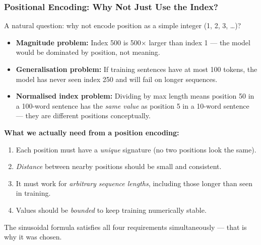 \begin{frame}[fragile]\frametitle{Positional Encoding: Why Not Just Use the Index?}

A natural question: why not encode position as a simple integer (1, 2, 3, \ldots)?

\begin{itemize}
\item \textbf{Magnitude problem:} Index 500 is 500$\times$ larger than index 1 --- the model would be dominated by position, not meaning.
\item \textbf{Generalisation problem:} If training sentences have at most 100 tokens, the model has never seen index 250 and will fail on longer sequences.
\item \textbf{Normalised index problem:} Dividing by max length means position 50 in a 100-word sentence has the \emph{same value} as position 5 in a 10-word sentence --- they are different positions conceptually.
\end{itemize}

\textbf{What we actually need from a position encoding:}
\begin{enumerate}
\item Each position must have a \emph{unique} signature (no two positions look the same).
\item \emph{Distance} between nearby positions should be small and consistent.
\item It must work for \emph{arbitrary sequence lengths}, including those longer than seen in training.
\item Values should be \emph{bounded} to keep training numerically stable.
\end{enumerate}

The sinusoidal formula satisfies all four requirements simultaneously --- that is why it was chosen.

\end{frame}

